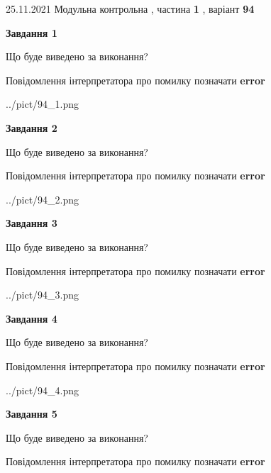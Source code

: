 \documentclass[10pt, ukrainian]{article}
\begin{document}
{25.11.2021 Модульна контрольна , частина \textbf { 1 }, варіант  \No \textbf { 94 }\par}
{
\begin {large}

{\begin {center}\textbf{Завдання 1}\end {center}}\par
Що буде виведено за виконання? \par
Повідомлення інтерпретатора про помилку позначати \textbf{error}

\begin{center}
	{../pict/94_1.png}
\end{center}
\newpage

{\begin {center}\textbf{Завдання 2}\end {center}}\par
Що буде виведено за виконання? \par
Повідомлення інтерпретатора про помилку позначати \textbf{error}

\begin{center}
	{../pict/94_2.png}
\end{center}
\newpage

{\begin {center}\textbf{Завдання 3}\end {center}}\par
Що буде виведено за виконання? \par
Повідомлення інтерпретатора про помилку позначати \textbf{error}

\begin{center}
	{../pict/94_3.png}
\end{center}
\newpage

{\begin {center}\textbf{Завдання 4}\end {center}}\par
Що буде виведено за виконання? \par
Повідомлення інтерпретатора про помилку позначати \textbf{error}

\begin{center}
	{../pict/94_4.png}
\end{center}
\newpage

{\begin {center}\textbf{Завдання 5}\end {center}}\par
Що буде виведено за виконання? \par
Повідомлення інтерпретатора про помилку позначати \textbf{error}


\end{large}}
\end{document}
